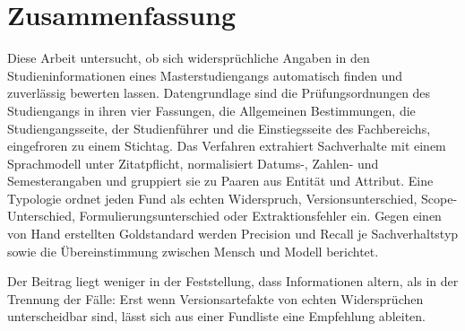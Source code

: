 
\section*{Zusammenfassung}

Diese Arbeit untersucht, ob sich widersprüchliche Angaben in den Studieninformationen eines
Masterstudiengangs automatisch finden und zuverlässig bewerten lassen. Datengrundlage sind
die Prüfungsordnungen des Studiengangs in ihren vier Fassungen, die Allgemeinen
Bestimmungen, die Studiengangsseite, der Studienführer und die Einstiegsseite des
Fachbereichs, eingefroren zu einem Stichtag. Das Verfahren extrahiert Sachverhalte mit einem
Sprachmodell unter Zitatpflicht, normalisiert Datums-, Zahlen- und Semesterangaben und
gruppiert sie zu Paaren aus Entität und Attribut. Eine Typologie ordnet jeden Fund als
echten Widerspruch, Versionsunterschied, Scope-Unterschied, Formulierungsunterschied oder
Extraktionsfehler ein. Gegen einen von Hand erstellten Goldstandard werden Precision und
Recall je Sachverhaltstyp sowie die Übereinstimmung zwischen Mensch und Modell berichtet.


Der Beitrag liegt weniger in der Feststellung, dass Informationen altern, als in der Trennung
der Fälle: Erst wenn Versionsartefakte von echten Widersprüchen unterscheidbar sind, lässt
sich aus einer Fundliste eine Empfehlung ableiten.
